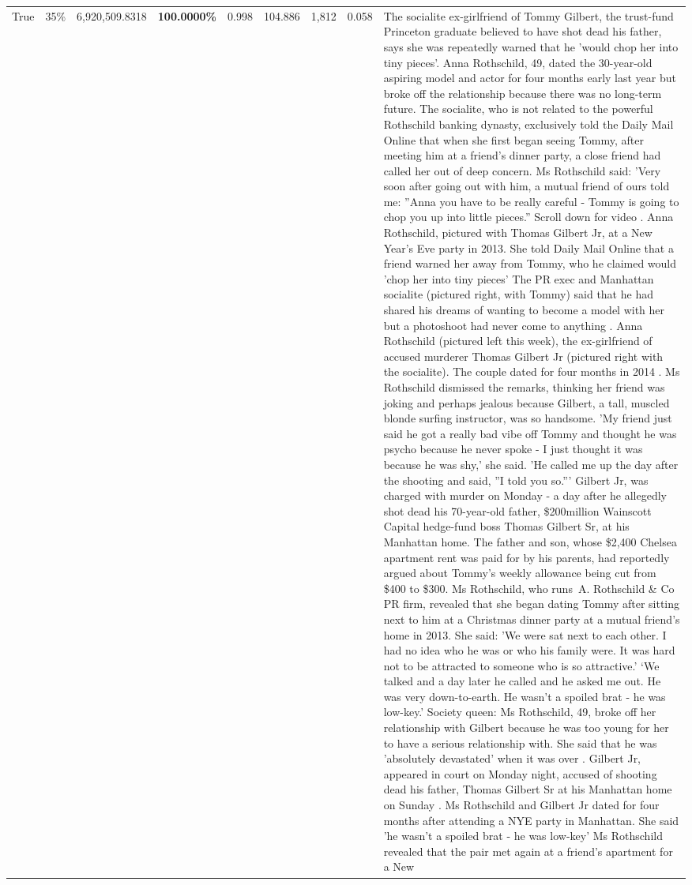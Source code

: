 \begin{table}[H]
\begin{tabular}{lllrlllll}
True & 35\% & 6,920,509.8318 & \bfseries \color{red} 100.0000\% & 0.998 & 104.886 & 1,812 & 0.058 & The socialite ex-girlfriend of Tommy Gilbert, the trust-fund Princeton graduate believed to have shot dead his father, says she was repeatedly warned that he 'would chop her into tiny pieces'. Anna Rothschild, 49, dated the 30-year-old aspiring model and actor for four months early last year but broke off the relationship because there was no long-term future. The socialite, who is not related to the powerful Rothschild banking dynasty, exclusively told the Daily Mail Online that when she first began seeing Tommy, after meeting him at a friend's dinner party, a close friend had called her out of deep concern. Ms Rothschild said: 'Very soon after going out with him, a mutual friend of ours told me: ''Anna you have to be really careful - Tommy is going to chop you up into little pieces.'' Scroll down for video . Anna Rothschild, pictured with Thomas Gilbert Jr, at a New Year's Eve party in 2013. She told Daily Mail Online that a friend warned her away from Tommy, who he claimed would 'chop her into tiny pieces' The PR exec and Manhattan socialite (pictured right, with Tommy) said that he had shared his dreams of wanting to become a model with her but a photoshoot had never come to anything . Anna Rothschild (pictured left this week), the ex-girlfriend of accused murderer Thomas Gilbert Jr (pictured right with the socialite). The couple dated for four months in 2014 . Ms Rothschild dismissed the remarks, thinking her friend was joking and perhaps jealous because Gilbert, a tall, muscled blonde surfing instructor, was so handsome. 'My friend just said he got a really bad vibe off Tommy and thought he was psycho because he never spoke - I just thought it was because he was shy,' she said. 'He called me up the day after the shooting and said, ''I told you so.''' Gilbert Jr, was charged with murder on Monday - a day after he allegedly shot dead his 70-year-old father, \$200million Wainscott Capital hedge-fund boss Thomas Gilbert Sr, at his Manhattan home. The father and son, whose \$2,400 Chelsea apartment rent was paid for by his parents, had reportedly argued about Tommy's weekly allowance being cut from \$400 to \$300. Ms Rothschild, who runs A. Rothschild \& Co PR firm, revealed that she began dating Tommy after sitting next to him at a Christmas dinner party at a mutual friend's home in 2013. She said: 'We were sat next to each other. I had no idea who he was or who his family were. It was hard not to be attracted to someone who is so attractive.' ‘We talked and a day later he called and he asked me out. He was very down-to-earth. He wasn’t a spoiled brat - he was low-key.’ Society queen: Ms Rothschild, 49, broke off her relationship with Gilbert because he was too young for her to have a serious relationship with. She said that he was 'absolutely devastated' when it was over . Gilbert Jr, appeared in court on Monday night, accused of shooting dead his father, Thomas Gilbert Sr at his Manhattan home on Sunday . Ms Rothschild and Gilbert Jr dated for four months after attending a NYE party in Manhattan. She said 'he wasn't a spoiled brat - he was low-key' Ms Rothschild revealed that the pair met again at a friend’s apartment for a New 
\end{tabular}
\end{table}
